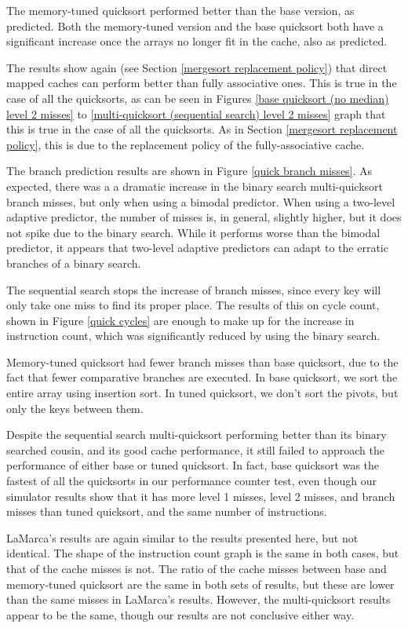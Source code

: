 The memory-tuned quicksort performed better than the base version, as predicted.
Both the memory-tuned version and the base quicksort both have a significant
increase once the arrays no longer fit in the cache, also as predicted.

The results show again (see Section \ref{mergesort replacement policy}) that
direct mapped caches can perform better than fully associative ones. This is
true in the case of all the quicksorts, as can be seen in Figures \ref{base
quicksort (no median) level 2 misses} to \ref{multi-quicksort (sequential
search) level 2 misses} graph that this is true in the case of all the
quicksorts. As in Section \ref{mergesort replacement policy}, this is due to the
replacement policy of the fully-associative cache.

The branch prediction results are shown in Figure \ref{quick branch misses}. As
expected, there was a a dramatic increase in the binary search multi-quicksort
branch misses, but only when using a bimodal predictor. When using a two-level
adaptive predictor, the number of misses is, in general, slightly higher, but it
does not spike due to the binary search. While it performs worse than the
bimodal predictor, it appears that two-level adaptive predictors can adapt to
the erratic branches of a binary search.

The sequential search stops the increase of branch misses, since every key will
only take one miss to find its proper place. The results of this on cycle
count, shown in Figure \ref{quick cycles} are enough to make up for the increase
in instruction count, which was significantly reduced by using the binary
search.

Memory-tuned quicksort had fewer branch misses than base quicksort, due to the fact
that fewer comparative branches are executed. In base quicksort, we sort the
entire array using insertion sort. In tuned quicksort, we don't sort the pivots,
but only the keys between them.

Despite the sequential search multi-quicksort performing better than its
binary searched cousin, and its good cache performance, it still failed to
approach the performance of either base or tuned quicksort. In fact, base
quicksort was the fastest of all the quicksorts in our performance counter test,
even though our simulator results show that it has more level 1 misses, level 2
misses, and branch misses than tuned quicksort, and the same number of
instructions.

LaMarca's results are again similar to the results presented here, but not
identical. The shape of the instruction count graph is the same in both cases,
but that of the cache misses is not. The ratio of the cache misses between base
and memory-tuned quicksort are the same in both sets of results, but these are lower
than the same misses in LaMarca's results. However, the multi-quicksort results
appear to be the same, though our results are not conclusive either way.


